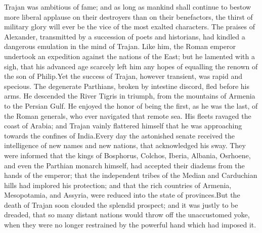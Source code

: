



Trajan was ambitious of fame; and as long as mankind shall
continue to bestow more liberal applause on their destroyers than
on their benefactors, the thirst of military glory will ever be
the vice of the most exalted characters. The praises of
Alexander, transmitted by a succession of poets and historians,
had kindled a dangerous emulation in the mind of Trajan. Like
him, the Roman emperor undertook an expedition against the
nations of the East; but he lamented with a sigh, that his
advanced age scarcely left him any hopes of equalling the renown
of the son of Philip.\footnotemark[19] Yet the success of Trajan, however
transient, was rapid and specious. The degenerate Parthians,
broken by intestine discord, fled before his arms. He descended
the River Tigris in triumph, from the mountains of Armenia to the
Persian Gulf. He enjoyed the honor of being the first, as he was
the last, of the Roman generals, who ever navigated that remote
sea. His fleets ravaged the coast of Arabia; and Trajan vainly
flattered himself that he was approaching towards the confines of
India.\footnotemark[20] Every day the astonished senate received the
intelligence of new names and new nations, that acknowledged his
sway. They were informed that the kings of Bosphorus, Colchos,
Iberia, Albania, Osrhoene, and even the Parthian monarch himself,
had accepted their diadems from the hands of the emperor; that
the independent tribes of the Median and Carduchian hills had
implored his protection; and that the rich countries of Armenia,
Mesopotamia, and Assyria, were reduced into the state of
provinces.\footnotemark[21] But the death of Trajan soon clouded the splendid
prospect; and it was justly to be dreaded, that so many distant
nations would throw off the unaccustomed yoke, when they were no
longer restrained by the powerful hand which had imposed it.





